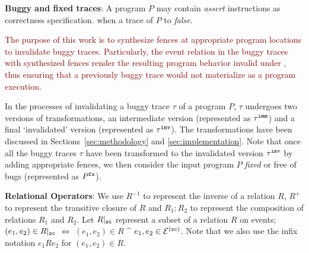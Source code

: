 \noindent
{\bf Buggy and fixed traces}: A program $P$ may contain {\em assert} 
instructions as correctness specification. 
 when a trace of $P$ 
  to
{\em false}. 


\textcolor{Maroon}{The purpose of this work 
is to synthesize \cc fences at appropriate
program locations to invalidate buggy traces. Particularly, the
event relation in the buggy traces with synthesized fences
render the resulting program behavior invalid under \cc, thus ensuring
that a previously buggy trace would not materialize as a 
\cc program execution.} 

 


In the processes of invalidating a buggy trace $\tau$ of a program $P$,
$\tau$ undergoes two versions of transformations, an intermediate version
(represented as ${\tau}^{\mathtt{imm}}$) and a final `invalidated' version (represented
as ${\tau}^{\mathtt{inv}}$). The transformations have been discussed in 
Sections~\ref{sec:methodology} and \ref{sec:implementation}.
%
Note that once all the buggy traces $\tau$ have been transformed to 
the invalidated version
${\tau}^{\mathtt{inv}}$ by adding appropriate fences, we then consider the input 
program $P$ {\em fixed} or free of bugs (represented as ${P}^{\mathtt{fx}}$). 

\noindent
{\bf Relational Operators}: 
We use $R^{-1}$ to represent the inverse of a relation $R$,
$R^+$ to represent the transitive closure of $R$ and 
$R_1;R_2$ to represent the composition of relations $R_1$ and $R_2$.
Let ${R{|}_\texttt{sc}} $ represent a subset of a relation $R$ on \sc events;
\ie $(e_1,e_2) \in {R{|}_\texttt{sc}} $ $\iff$ $(e_1,e_2) \in R$ $\^$
$e_1,e_2 \in \mathcal{E}^{(\texttt{sc})}$. Note that we also use the infix 
notation $e_1Re_2$ for $(e_1,e_2) \in R$.
